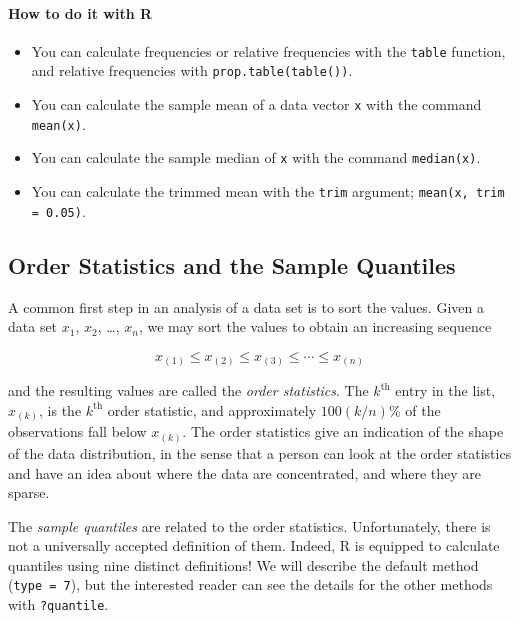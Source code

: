 \documentclass[captions=tableheading]{scrbook}
\begin{document}
\paragraph*{How to do it with \textsf{R}}

\begin{itemize}
\item You can calculate frequencies or relative frequencies with the \texttt{table} function, and relative frequencies with \texttt{prop.table(table())}. \item You can calculate the sample mean of a data vector \texttt{x} with the command \texttt{mean(x)}.
\item You can calculate the sample median of \texttt{x} with the command \texttt{median(x)}. \item You can calculate the trimmed mean with the \texttt{trim} argument; \texttt{mean(x, trim = 0.05)}.
\end{itemize}
\subsection{Order Statistics and the Sample Quantiles}
\label{sec-3-3-3}

\label{sub:Order-Statistics-and}

A common first step in an analysis of a data set is to sort the values. Given a data set \(x_{1}\), \(x_{2}\), \ldots{}, \(x_{n}\), we may sort the values to obtain an increasing sequence

\begin{equation} 
x_{(1)}\leq x_{(2)}\leq x_{(3)}\leq\cdots\leq x_{(n)}
\end{equation}

and the resulting values are called the \emph{order statistics}. The \(k^{\mathrm{th}}\) entry in the list, \(x_{(k)}\), is the \(k^{\mathrm{th}}\) order statistic, and approximately \(100(k/n)\)\% of the observations fall below \(x_{(k)}\). The order statistics give an indication of the shape of the data distribution, in the sense that a person can look at the order statistics and have an idea about where the data are concentrated, and where they are sparse.

The \emph{sample quantiles} are related to the order statistics. Unfortunately, there is not a universally accepted definition of them. Indeed, \textsf{R} is equipped to calculate quantiles using nine distinct definitions! We will describe the default method (\texttt{type = 7}), but the interested reader can see the details for the other methods with \texttt{?quantile}.
\end{document}
